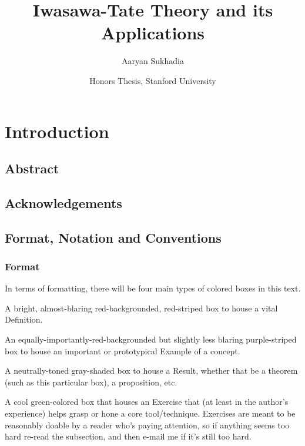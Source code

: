 \documentclass[11pt, x11names]{book}
\begin{document}
\title{Iwasawa-Tate Theory and its Applications}

\author{Aaryan Sukhadia}
\date{Honors Thesis, Stanford University}
\onehalfspacing

\maketitle

\tableofcontents

\chapter{Introduction}

\section*{Abstract}
\label{section: Abstract}


\newpage


\section*{Acknowledgements}
\label{section: Acknowledgements}


\newpage

\section*{Format, Notation and Conventions}
\label{section: Format, Notation and Conventions}

\subsection*{Format}
In terms of formatting, there will be four main types of colored boxes in this text.
\begin{defn} 
    A bright, almost-blaring red-backgrounded, red-striped box to house a vital Definition.
\end{defn}
\begin{example}
    An equally-importantly-red-backgrounded but slightly less blaring purple-striped box to house an important or prototypical Example of a concept.
\end{example}
\begin{theorem}
    A neutrally-toned gray-shaded box to house a Result, whether that be a theorem (such as this particular box), a proposition, etc.
\end{theorem}
\begin{exercise}
    A cool green-colored box that houses an Exercise that (at least in the author's experience) helps grasp or hone a core tool/technique. Exercises are meant to be reasonably doable by a reader who's paying attention, so if anything seems too hard re-read the subsection, and then e-mail me if it's still too hard.
\end{exercise}
\end{document}
